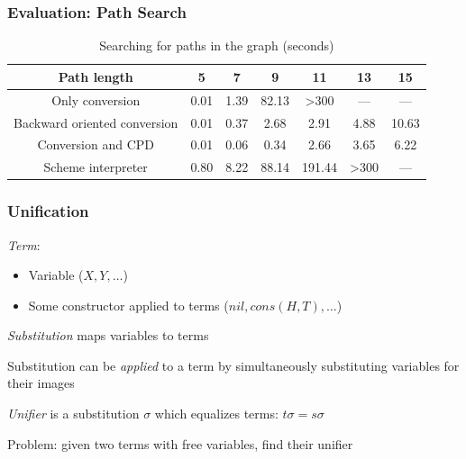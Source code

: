 \documentclass[xcolor=table]{beamer}
\begin{document}
\begin{frame}[fragile]
  \transwipe[direction=90]
  \frametitle{Evaluation: Path Search}

\begin{table}
\footnotesize
\centering
\begin{tabular}{c|c|c|c|c|c|c}
Path length                   & 5      & 7     & 9      & 11      & 13     & 15        \\
\hline\hline
Only conversion               & 0.01  & 1.39 &  82.13 & >300     & ---      & ---     \\
\hline
Backward oriented conversion  & 0.01 & 0.37 &  2.68 & 2.91   & 4.88    & 10.63   \\
\hline
Conversion and CPD            & 0.01  & 0.06 &  0.34 & 2.66   & 3.65    & 6.22  \\
\hline
Scheme interpreter            & 0.80  & 8.22 & 88.14 & 191.44 & >300   & ---   \\
\end{tabular}

 \caption{Searching for paths in the graph (seconds)}
    \label{tab:is_path}
\end{table}
\end{frame}



\begin{frame}[fragile]
  \transwipe[direction=90]
  \frametitle{Unification}

\emph{Term}:
\begin{itemize}
	\item Variable ($X, Y, \dots$)
	\item Some constructor applied to terms ($nil, cons(H, T), \dots$)
\end{itemize}

\pause
\vspace{10pt}

\emph{Substitution} maps variables to terms

\vspace{10pt}

Substitution can be \emph{applied} to a term by simultaneously substituting variables for their images

\vspace{10pt}
\pause

\emph{Unifier} is a substitution $\sigma$ which equalizes terms: $t \sigma = s \sigma$

\vspace{10pt}

\pause
Problem: given two terms with free variables, find their unifier

\end{frame}
\end{document}
